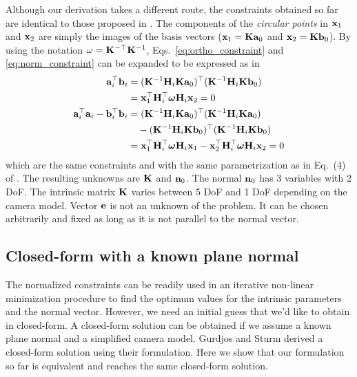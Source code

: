 \documentclass[10pt,twocolumn,letterpaper]{article}
\begin{document}
Although our derivation takes a different route, the constraints obtained so far are identical to those proposed in \cite{bocquillon2006}. The components of the \emph{circular points} in \cite{bocquillon2006} $\mathbf{x}_1$ and $\mathbf{x}_2$ are simply the images of the basis vectors (\ie $\mathbf{x}_1=\mathbf{K} \mathbf{a}_0$ and $\mathbf{x}_2=\mathbf{K} \mathbf{b}_0$). By using the notation $\omega=\mathbf{K}^{-\top}\mathbf{K}^{-1}$, Eqs.~\eqref{eq:ortho_constraint} and \eqref{eq:norm_constraint} can be expanded to be expressed as in \cite{bocquillon2006}
%
\begin{align}
\mathbf{a}_i^\top \mathbf{b}_i &= (\mathbf{K}^{-1} \mathbf{H}_i \mathbf{K} \mathbf{a}_0)^\top (\mathbf{K}^{-1} \mathbf{H}_i \mathbf{K} \mathbf{b}_0) \notag \\
&= \mathbf{x}_1^\top \mathbf{H}_i^\top \bm{\omega} \mathbf{H}_i \mathbf{x}_2 = 0 
\\
\mathbf{a}_i^\top \mathbf{a}_i - \mathbf{b}_i^\top \mathbf{b}_i &= (\mathbf{K}^{-1} \mathbf{H}_i \mathbf{K} \mathbf{a}_0)^\top (\mathbf{K}^{-1} \mathbf{H}_i \mathbf{K} \mathbf{a}_0) \notag 
\\
&\quad - (\mathbf{K}^{-1} \mathbf{H}_i \mathbf{K} \mathbf{b}_0)^\top (\mathbf{K}^{-1} \mathbf{H}_i \mathbf{K} \mathbf{b}_0) \notag 
\\
&= \mathbf{x}_1^\top \mathbf{H}_i^\top \bm{\omega} \mathbf{H}_i \mathbf{x}_1 - \mathbf{x}_2^\top \mathbf{H}_i^\top \bm{\omega} \mathbf{H}_i \mathbf{x}_2 = 0 
\end{align}
which are the same constraints and with the same parametrization as in Eq.~(4) of \cite{bocquillon2006}. The resulting unknowns are $\mathbf{K}$ and $\mathbf{n}_0$. The normal $\mathbf{n}_0$ has 3 variables with 2 DoF. The intrinsic matrix $\mathbf{K}$ varies between 5 DoF and 1 DoF depending on the camera model. Vector $\mathbf{e}$ is not an unknown of the problem. It can be chosen arbitrarily and fixed as long as it is not parallel to the normal vector.


\subsection{Closed-form with a known plane normal}
\label{sec:calib:closed}

The normalized constraints can be readily used in an iterative non-linear minimization procedure to find the optimum values for the intrinsic parameters and the normal vector. However, we need an initial guess that we'd like to obtain in closed-form. A closed-form solution can be obtained if we assume a known plane normal and a simplified camera model. Gurdjos and Sturm \cite{gurdjos2003} derived a closed-form solution using their formulation. Here we show that our formulation so far is equivalent and reaches the same closed-form solution.
\end{document}
